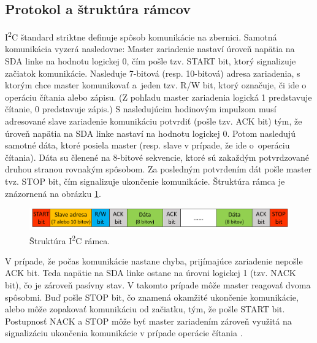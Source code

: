 \subsection{Protokol a štruktúra rámcov}
I\textsuperscript{2}C štandard striktne definuje spôsob komunikácie na zbernici. Samotná komunikácia vyzerá nasledovne: Master zariadenie nastaví úroveň napätia na SDA linke na hodnotu logickej 0, čím pošle tzv. START bit, ktorý signalizuje začiatok komunikácie. Nasleduje 7-bitová (resp. 10-bitová) adresa zariadenia, s ktorým chce master komunikovať a~jeden tzv. R/W bit, ktorý označuje, či ide o operáciu čítania alebo zápisu. (Z pohľadu master zariadenia logická 1 predstavuje čítanie, 0 predstavuje zápis.) S nasledujúcim hodinovým impulzom musí adresované slave zariadenie komunikáciu potvrdiť (pošle tzv. ACK bit) tým, že úroveň napätia na SDA linke nastaví na hodnotu logickej 0. Potom nasledujú samotné dáta, ktoré posiela master (resp. slave v prípade, že ide o~operáciu čítania). Dáta su členené na 8-bitové sekvencie, ktoré sú zakaždým potvrdzované druhou stranou rovnakým spôsobom. Za posledným potvrdením dát pošle master tvz. STOP bit, čím signalizuje ukončenie komunikácie. Štruktúra rámca je znázornená na obrázku \ref{obr:i2cFrame}.

\begin{figure}
    \centerline{\includegraphics[width=1\textwidth]{images/i2cFrame.png}}
    \caption[Štruktúra I\textsuperscript{2}C rámca]{Štruktúra I\textsuperscript{2}C rámca.}
    \label{obr:i2cFrame}
\end{figure}

V prípade, že počas komunikácie nastane chyba, prijímajúce zariadenie nepošle ACK bit. Teda napätie na SDA linke ostane na úrovni logickej 1 (tzv. NACK bit), čo je zároveň pasívny stav. V takomto prípade môže master reagovať dvoma spôsobmi. Buď pošle STOP bit, čo znamená okamžité ukončenie komunikácie, alebo môže zopakovať komunikáciu od začiatku, tým, že pošle START bit. Postupnosť NACK a STOP môže byť master zariadením zároveň využitá na signalizáciu ukončenia komunikácie v prípade operácie čítania \cite{i2cSpec}.